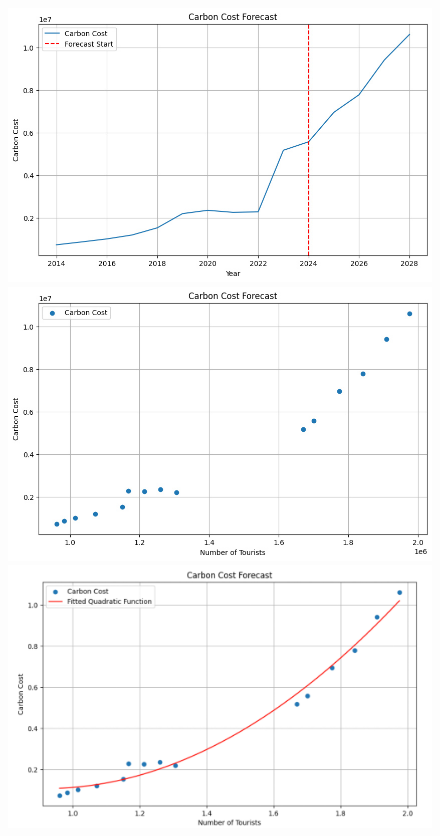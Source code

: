 \begin{figure}[H]
\begin{minipage}{0.32\textwidth}
    \end{minipage}
\end{figure}

\begin{figure}[H]
    \centering
    \begin{minipage}{0.32\textwidth}
        \centering
        \includegraphics[width=\textwidth]{Cost.jpg}
    \end{minipage}
    \begin{minipage}{0.32\textwidth}
        \centering
        \includegraphics[width=\textwidth]{Carbon_pred1.jpg}
    \end{minipage}
    \begin{minipage}{0.33\textwidth}
        \centering
        \includegraphics[width=\textwidth]{Carbon_pred2.jpg}

\end{minipage}
\end{figure}
